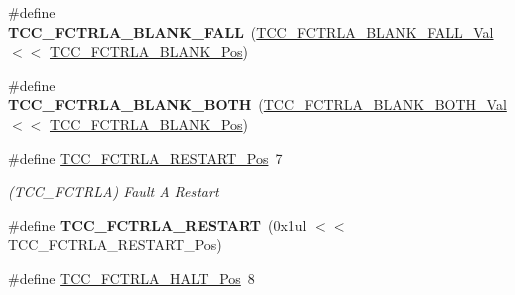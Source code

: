 \begin{DoxyCompactItemize}
\item 
\hypertarget{group___s_a_m_l21___t_c_c_gad5a029254ab8acf61c434307fd6810c5}{}\#define {\bfseries T\+C\+C\+\_\+\+F\+C\+T\+R\+L\+A\+\_\+\+B\+L\+A\+N\+K\+\_\+\+F\+A\+L\+L}~(\hyperlink{group___s_a_m_l21___t_c_c_gad6f465e0d748dc05194f1945be43b360}{T\+C\+C\+\_\+\+F\+C\+T\+R\+L\+A\+\_\+\+B\+L\+A\+N\+K\+\_\+\+F\+A\+L\+L\+\_\+\+Val}     $<$$<$ \hyperlink{group___s_a_m_l21___t_c_c_ga415d0c8ac0d97192b0e236e3a6184824}{T\+C\+C\+\_\+\+F\+C\+T\+R\+L\+A\+\_\+\+B\+L\+A\+N\+K\+\_\+\+Pos})\label{group___s_a_m_l21___t_c_c_gad5a029254ab8acf61c434307fd6810c5}

\item 
\hypertarget{group___s_a_m_l21___t_c_c_gad6c69cde2c730d021c1a052055eefc57}{}\#define {\bfseries T\+C\+C\+\_\+\+F\+C\+T\+R\+L\+A\+\_\+\+B\+L\+A\+N\+K\+\_\+\+B\+O\+T\+H}~(\hyperlink{group___s_a_m_l21___t_c_c_gad9d4204aefc55605386280e8930f7e2b}{T\+C\+C\+\_\+\+F\+C\+T\+R\+L\+A\+\_\+\+B\+L\+A\+N\+K\+\_\+\+B\+O\+T\+H\+\_\+\+Val}     $<$$<$ \hyperlink{group___s_a_m_l21___t_c_c_ga415d0c8ac0d97192b0e236e3a6184824}{T\+C\+C\+\_\+\+F\+C\+T\+R\+L\+A\+\_\+\+B\+L\+A\+N\+K\+\_\+\+Pos})\label{group___s_a_m_l21___t_c_c_gad6c69cde2c730d021c1a052055eefc57}

\item 
\hypertarget{group___s_a_m_l21___t_c_c_ga839cdbce9eeba95f10d91272e2826bb0}{}\#define \hyperlink{group___s_a_m_l21___t_c_c_ga839cdbce9eeba95f10d91272e2826bb0}{T\+C\+C\+\_\+\+F\+C\+T\+R\+L\+A\+\_\+\+R\+E\+S\+T\+A\+R\+T\+\_\+\+Pos}~7\label{group___s_a_m_l21___t_c_c_ga839cdbce9eeba95f10d91272e2826bb0}

\begin{DoxyCompactList}\small\item\em (T\+C\+C\+\_\+\+F\+C\+T\+R\+L\+A) Fault A Restart \end{DoxyCompactList}\item 
\hypertarget{group___s_a_m_l21___t_c_c_ga9c9881441ccfbc0b84bba47966546ef1}{}\#define {\bfseries T\+C\+C\+\_\+\+F\+C\+T\+R\+L\+A\+\_\+\+R\+E\+S\+T\+A\+R\+T}~(0x1ul $<$$<$ T\+C\+C\+\_\+\+F\+C\+T\+R\+L\+A\+\_\+\+R\+E\+S\+T\+A\+R\+T\+\_\+\+Pos)\label{group___s_a_m_l21___t_c_c_ga9c9881441ccfbc0b84bba47966546ef1}

\item 
\hypertarget{group___s_a_m_l21___t_c_c_ga8057b61f673517b6a99ea43d1942b094}{}\#define \hyperlink{group___s_a_m_l21___t_c_c_ga8057b61f673517b6a99ea43d1942b094}{T\+C\+C\+\_\+\+F\+C\+T\+R\+L\+A\+\_\+\+H\+A\+L\+T\+\_\+\+Pos}~8\label{group___s_a_m_l21___t_c_c_ga8057b61f673517b6a99ea43d1942b094}


\end{DoxyCompactItemize}
